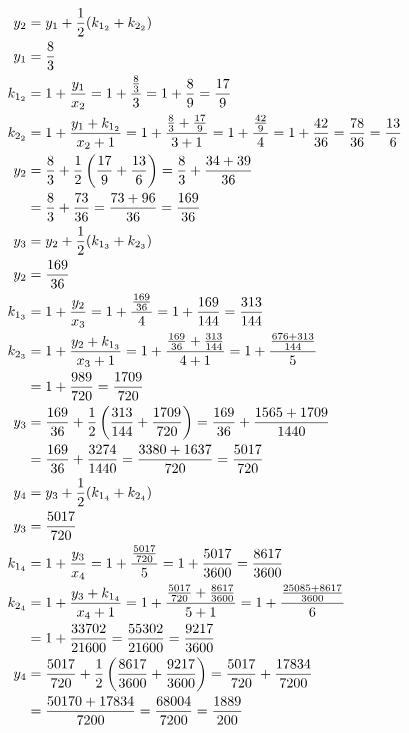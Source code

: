 	\begin{align}
		y_{2} &= y_{1} + \frac{1}{2}(k_{1_{2}}+k_{2_{2}})& \\
		y_{1} &= \frac{8}{3}& \\
		k_{1_{2}} &= 1 + \frac{y_{1}}{x_{2}} = 1 + \frac{\frac{8}{3}}{3} = 1 + \frac{8}{9} = \frac{17}{9}& \\
		k_{2_{2}} &= 1 + \frac{y_{1} + k_{1_{2}}}{x_{2} + 1} = 1 + \frac{\frac{8}{3} + \frac{17}{9}}{3 + 1} = 1 + \frac{\frac{42}{9}}{4} = 1 + \frac{42}{36} = \frac{78}{36} = \frac{13}{6}& \\
		y_{2} &= \frac{8}{3} + \frac{1}{2}\left(\frac{17}{9}+\frac{13}{6}\right) = \frac{8}{3} + \frac{34 + 39}{36}& \notag \\
		&= \frac{8}{3} + \frac{73}{36} = \frac{73 + 96}{36} = \frac{169}{36}& \\
		y_{3} &= y_{2} + \frac{1}{2}(k_{1_{3}}+k_{2_{3}})& \\
		y_{2} &= \frac{169}{36}& \\
		k_{1_{3}} &= 1 + \frac{y_{2}}{x_{3}} = 1 + \frac{\frac{169}{36}}{4} = 1 + \frac{169}{144} = \frac{313}{144}& \\
		k_{2_{3}} &= 1 + \frac{y_{2} + k_{1_{3}}}{x_{3} + 1} = 1 + \frac{\frac{169}{36} + \frac{313}{144}}{4 + 1} = 1 + \frac{\frac{676+313}{144}}{5}& \notag \\
		&= 1 + \frac{989}{720} = \frac{1709}{720}& \\
		y_{3} &= \frac{169}{36} + \frac{1}{2}\left(\frac{313}{144}+\frac{1709}{720}\right) = \frac{169}{36} + \frac{1565 + 1709}{1440}& \notag \\
		&= \frac{169}{36} + \frac{3274}{1440} = \frac{3380 + 1637}{720} = \frac{5017}{720}& \\
		y_{4} &= y_{3} + \frac{1}{2}(k_{1_{4}}+k_{2_{4}})& \\
		y_{3} &= \frac{5017}{720}& \\
		k_{1_{4}} &= 1 + \frac{y_{3}}{x_{4}} = 1 + \frac{\frac{5017}{720}}{5} = 1 + \frac{5017}{3600} = \frac{8617}{3600}& \\
		k_{2_{4}} &= 1 + \frac{y_{3} + k_{1_{4}}}{x_{4} + 1} = 1 + \frac{\frac{5017}{720} + \frac{8617}{3600}}{5 + 1} = 1 + \frac{\frac{25085+8617}{3600}}{6}& \notag \\
		&= 1 + \frac{33702}{21600} = \frac{55302}{21600} = \frac{9217}{3600}& \\
		y_{4} &= \frac{5017}{720} + \frac{1}{2}\left(\frac{8617}{3600}+\frac{9217}{3600}\right) = \frac{5017}{720} + \frac{17834}{7200}& \notag \\
		&= \frac{50170 + 17834}{7200} = \frac{68004}{7200} = \frac{1889}{200}&
	\end{align}

